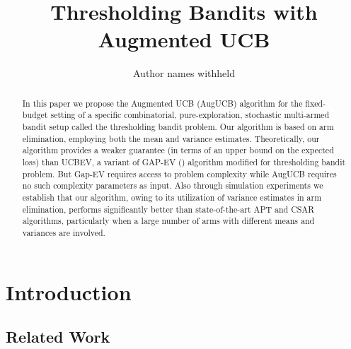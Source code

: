 \documentclass{article}
\title{Thresholding Bandits with Augmented UCB}
\author{Author names withheld}
\begin{document}
\maketitle

\begin{abstract}
In this paper we propose the Augmented UCB (AugUCB) algorithm for the fixed-budget setting of a specific combinatorial, pure-exploration, stochastic multi-armed bandit setup called the thresholding bandit problem. Our algorithm is based on arm elimination, employing both the mean and variance estimates. Theoretically, our algorithm provides a weaker guarantee (in terms of an upper bound on the expected loss) than UCBEV, a variant of GAP-EV (\cite{gabillon2011multi}) algorithm modified for thresholding bandit problem. But Gap-EV requires access to problem complexity while AugUCB requires no such complexity parameters as input. Also through simulation experiments we establish that our algorithm, owing to its utilization of variance estimates in arm elimination, performs   significantly better than state-of-the-art APT and CSAR algorithms, particularly when a large number of arms with different means and variances are involved. 


\end{abstract}


\section{Introduction}
\label{intro}


\subsection{Related Work}
\label{prevRes}

\end{document}

